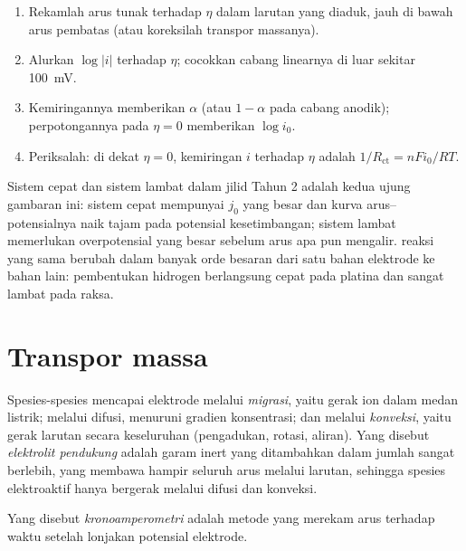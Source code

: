 \begin{method}\label{met:b3:electrode-kinetics:tafel-analysis}
\begin{enumerate}
  \item Rekamlah arus tunak terhadap $\eta$ dalam larutan yang diaduk, jauh di
        bawah arus pembatas (atau koreksilah transpor massanya).
  \item Alurkan $\log|i|$ terhadap $\eta$; cocokkan cabang linearnya di luar
        sekitar \qty{100}{mV}.
  \item Kemiringannya memberikan $\alpha$ (atau $1 - \alpha$ pada cabang anodik);
        perpotongannya pada $\eta = 0$ memberikan $\log i_0$.
  \item Periksalah: di dekat $\eta = 0$, kemiringan $i$ terhadap $\eta$ adalah
        $1/R_{\mathrm{ct}} = nFi_0/RT$.
\end{enumerate}
\end{method}

Sistem cepat dan sistem lambat dalam jilid Tahun 2 adalah kedua ujung gambaran
ini: sistem cepat mempunyai $j_0$ yang besar dan kurva arus--potensialnya naik
tajam pada potensial kesetimbangan; sistem lambat memerlukan overpotensial
yang besar sebelum arus apa pun mengalir.  reaksi yang
sama berubah dalam banyak orde besaran dari satu bahan elektrode ke bahan
lain: pembentukan hidrogen berlangsung cepat pada platina dan sangat lambat
pada raksa.

\section{Transpor massa}

\begin{definition}\label{def:b3:electrode-kinetics:transport}
Spesies-spesies mencapai elektrode melalui \emph{migrasi},
yaitu gerak ion dalam medan listrik; melalui difusi, menuruni gradien
konsentrasi; dan melalui \emph{konveksi}, yaitu gerak larutan
secara keseluruhan (pengadukan, rotasi, aliran). Yang disebut \emph{elektrolit
pendukung} adalah garam inert yang ditambahkan
dalam jumlah sangat berlebih, yang membawa hampir seluruh arus melalui
larutan, sehingga spesies elektroaktif hanya bergerak melalui difusi dan
konveksi.
\end{definition}

\begin{definition}[Kronoamperometri]\label{def:b3:electrode-kinetics:chronoamperometry}
Yang disebut \emph{kronoamperometri} adalah metode
yang merekam arus terhadap waktu setelah lonjakan potensial elektrode.
\end{definition}

